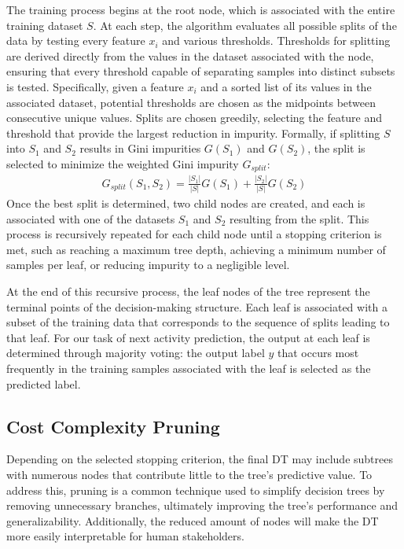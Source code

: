 The training process begins at the root node,
which is associated with the entire training dataset $S$.
At each step, the algorithm evaluates all possible splits of the data by testing every feature $x_i$
and various thresholds.
Thresholds for splitting are derived directly from the values in the dataset associated with the node,
ensuring that every threshold capable of separating samples into distinct subsets is tested.
Specifically, given a feature $x_i$ and a sorted list of its values in the associated dataset,
potential thresholds are chosen as the midpoints between consecutive unique values.
Splits are chosen greedily, selecting the feature and threshold that provide the largest reduction in impurity.
Formally, if splitting $S$ into $S_1$ and $S_2$ results in Gini impurities $G(S_1)$ and $G(S_2)$,
the split is selected to minimize the weighted Gini impurity $G_{split}$:
\begin{align}
  G_{split}(S_1, S_2) = \frac{|S_1|}{|S|}G(S_1) + \frac{|S_2|}{|S|}G(S_2)
\end{align}
Once the best split is determined, two child nodes are created,
and each is associated with one of the datasets $S_1$ and $S_2$ resulting from the split.
This process is recursively repeated for each child node until a stopping criterion is met,
such as reaching a maximum tree depth, achieving a minimum number of samples per leaf,
or reducing impurity to a negligible level.

At the end of this recursive process,
the leaf nodes of the tree represent the terminal points of the decision-making structure.
Each leaf is associated with a subset of the training data
that corresponds to the sequence of splits leading to that leaf.
For our task of next activity prediction,
the output at each leaf is determined through majority voting:
the output label $y$ that occurs most frequently in the training samples
associated with the leaf is selected as the predicted label.

\subsection{Cost Complexity Pruning}
Depending on the selected stopping criterion,
the final DT may include subtrees with numerous nodes
that contribute little to the tree's predictive value.
To address this, pruning is a common technique used to simplify decision trees
by removing unnecessary branches, ultimately improving the tree's performance and generalizability.
Additionally, the reduced amount of nodes 
will make the DT more easily interpretable for human stakeholders.

